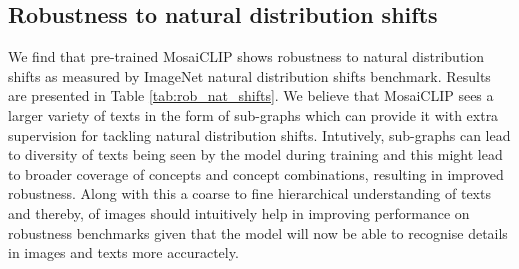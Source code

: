 \documentclass[11pt]{article}
\newcommand{\methodcomp}{MosaiCLIP}
\begin{document}
\begin{table}[h!]
\subsection{Robustness to natural distribution shifts}
\label{robustness_detailed_results}
We find that pre-trained \methodcomp{} shows robustness to natural distribution shifts as measured by ImageNet natural distribution shifts benchmark. Results are presented in Table \ref{tab:rob_nat_shifts}. We believe that \methodcomp{} sees a larger variety of texts in the form of sub-graphs which can provide it with extra supervision for tackling natural distribution shifts. Intutively, sub-graphs can lead to diversity of texts being seen by the model during training and this might lead to broader coverage of concepts and concept combinations, resulting in improved robustness. Along with this a coarse to fine 
 hierarchical understanding of texts and thereby, of images should intuitively help in improving performance on robustness benchmarks given that the model will now be able to recognise details in images and texts more accuractely.


\end{table}
\end{document}
